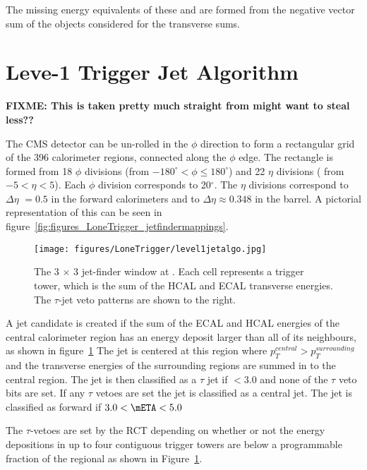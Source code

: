 The missing energy equivalents of these \MET and \MHT are formed from the 
negative vector sum of the objects considered for the
transverse sums.



\section{Leve-1 Trigger Jet Algorithm} %
\label{sec:leve_1_trigger_jet_algorithm}

\textbf{FIXME: This is taken pretty much straight from \cite{gctcomm} might 
want to steal less??} 

The CMS detector can be un-rolled in the $\phi$ direction to form a rectangular 
grid of the 396 calorimeter regions, connected along the $\phi$ edge. The
rectangle is formed from 18 $\phi$ divisions (from $-180^{\circ} < \phi \leq 180^{\circ}$) and 22 $\eta$ divisions ( from $-5 < \eta < 5$). Each $\phi$ division corresponds to 20$^{\circ}$. The $\eta$ divisions correspond to $\Delta\eta$ $= 0.5$ in the forward calorimeters and to $\Delta\eta \approx 0.348$ in the barrel. A pictorial representation of this can be seen in 
figure~\ref{fig:figures_LoneTrigger_jetfindermappings}.

\begin{figure}[ht]
  \centering
    \texttt{[image: figures/LoneTrigger/level1jetalgo.jpg]}
  \caption{The 3 $\times$ 3 jet-finder window at \Lone. Each cell represents a 
  trigger tower, which is the sum of the HCAL and ECAL transverse energies. The 
  $\tau$-jet veto patterns are shown to the right.}
  \label{fig:figures_LoneTrigger_level1jetalgo}
\end{figure}


A jet candidate is created if the sum of the ECAL and HCAL energies of the 
central calorimeter region has an energy deposit larger than all of its 
neighbours, as shown in figure~\ref{fig:figures_LoneTrigger_level1jetalgo}
The jet is centered at this region where $p_{T}^{central} > p_{T}^{surrounding}$
and the transverse energies of the surrounding regions are summed in to the 
central region. The jet is then classified as a $\tau$ jet if \mETA $< 3.0$ and 
none of the $\tau$ veto bits are set. If any $\tau$ vetoes are set the jet is 
classified as a central jet. The jet is classified as forward if $ 3.0 < \mETA 
< 5.0$

The $\tau$-vetoes are set by the RCT depending on whether or not the energy 
depositions in up to four contiguous trigger towers are below a programmable 
fraction of the regional \ET as shown in 
Figure~\ref{fig:figures_LoneTrigger_level1jetalgo}.

